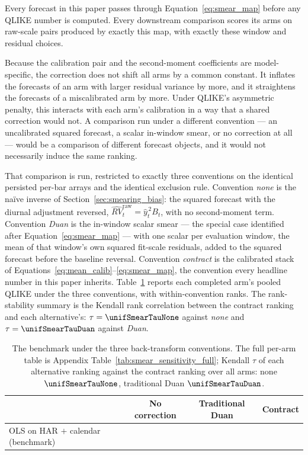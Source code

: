Every forecast in this paper passes through Equation~\eqref{eq:smear_map}
before any QLIKE number is computed. Every downstream comparison
 scores its arms on raw-scale pairs produced by exactly this map,
with exactly these window and residual choices.

Because the calibration pair and the second-moment coefficients are
model-specific, the correction does not shift all arms by a common
constant. It inflates the forecasts of an arm with larger residual
variance by more, and it straightens the forecasts of a miscalibrated arm
by more. Under QLIKE's asymmetric penalty, this interacts with each arm's
calibration in a way that a shared correction would not. A comparison run
under a different convention --- an uncalibrated squared forecast, a
scalar in-window smear, or no correction at all --- would be a comparison
of different forecast objects, and it would not necessarily induce the
same ranking.

That comparison is run, restricted to exactly three conventions on the
identical persisted per-bar arrays and the identical exclusion rule.
Convention \emph{none} is the na\"ive inverse of
Section~\ref{sec:smearing_bias}: the squared forecast with the diurnal
adjustment reversed, $\widehat{RV}_t^{\mathrm{raw}} = \hat{y}_t^{\,2} B_t$,
with no second-moment term. Convention \emph{Duan} is the in-window scalar
smear --- the \citet{Duan1983} special case identified after
Equation~\eqref{eq:smear_map} --- with one scalar per evaluation window,
the mean of that window's own squared fit-scale residuals, added to the
squared forecast before the baseline reversal. Convention \emph{contract}
is the calibrated stack of
Equations~\eqref{eq:mean_calib}--\eqref{eq:smear_map}, the convention
every headline number in this paper inherits.
Table~\ref{tab:smear_sensitivity} reports each completed arm's pooled
QLIKE under the three conventions, with within-convention ranks. The
rank-stability summary is the Kendall rank correlation between the
contract ranking and each alternative's:
$\tau = \unifSmearTauNone$ against \emph{none} and
$\tau = \unifSmearTauDuan$ against \emph{Duan}.

\begin{table}[H]
\centering
\caption{The benchmark under the three back-transform conventions. The
full per-arm table is Appendix Table~\ref{tab:smear_sensitivity_full};
Kendall $\tau$ of each alternative ranking against the contract ranking
over all arms: none $\unifSmearTauNone$, traditional Duan
$\unifSmearTauDuan$.}
\label{tab:smear_sensitivity}
\begin{tabular}{@{}lccc@{}}
\toprule
 & No correction & Traditional Duan & Contract \\
\midrule
OLS on HAR $+$ calendar (benchmark) & \unifAzeroQLIKENone{} & \unifAzeroQLIKEDuan{} & \unifAzeroQLIKE{} \\
\bottomrule
\end{tabular}
\end{table}

